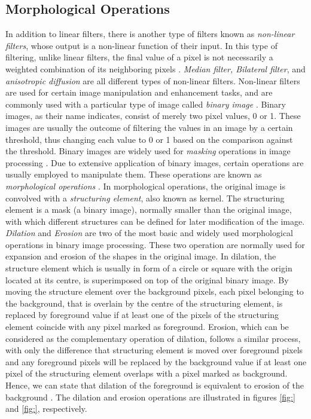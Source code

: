 \subsection{Morphological Operations}
In addition to linear filters, there is another type of filters known as {\it non-linear filters}, whose output is a non-linear function of their input. 
In this type of filtering, unlike linear filters, the final value of a pixel is not necessarily 
a weighted combination of its neighboring pixels \cite{sze11}. 
{\it Median filter, Bilateral filter}, and {\it anisotropic diffusion} are all different types of non-linear filters. Non-linear filters are used for certain image manipulation 
and enhancement tasks, and are commonly used with a particular type of image called {\it binary
image} \cite{sze11}. Binary images, as their name indicates, consist of merely two pixel values, 0 or 1. These images are usually the outcome of filtering the values in an image 
by a certain threshold, thus changing each value to 0 or 1 based on the comparison against the threshold. Binary images are
widely used for {\it masking} operations in image processing \cite{sze11}. Due to extensive application of binary images, certain operations are usually employed to manipulate them. 
These operations are known as {\it morphological operations} \cite{ritt00}.
In morphological operations, the original image is convolved with a {\it structuring element}, also known as kernel. 
The structuring element is a mask (a binary image), normally smaller than the original image, 
with which different structures can be defined for later modification of the image. 
{\it Dilation} and {\it Erosion} are two of the most basic and widely used morphological operations in binary image processing.
These two operation are normally used for expansion and erosion of the shapes in the original image. 
In dilation, the structure element which is usually in form of a circle or square with the origin located at its centre, is superimposed on top of the original binary image.
By moving the structure element over the background pixels, each pixel belonging to the background, that 
is overlain by the centre of the structuring element, is replaced by foreground value if at least one of the pixels of the structuring element coincide with any pixel marked as foreground.
Erosion, which can be considered as the complementary operation of dilation, follows a similar process, with only the difference that structuring element is moved over foreground pixels and any
foreground pixels will be replaced by the background value if at least one pixel of the structuring element overlaps with a pixel marked as background.
Hence, we can state that dilation of the foreground is equivalent to erosion of the background \cite{ritt00}.
The dilation and erosion operations are illustrated in figures \ref{fig:} and \ref{fig:}, respectively.

